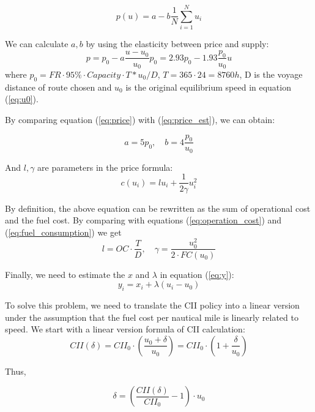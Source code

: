 \documentclass[a4paper,12pt]{article}
\begin{document}
\begin{equation*}
	p(u) = a - b \frac{1}{N}\sum_{i=1}^N u_i
\end{equation*}

We can calculate $a,b$ by using the elasticity between price and supply:
\begin{equation}
	\label{eq:price_est}
	p = p_0  - a \dfrac{u-u_0}{u_0} p_0 = 2.93 p_0 - 1.93 \dfrac{p_0}{u_0}u
\end{equation}
where $p_0 = FR \cdot 95\% \cdot Capacity \cdot T * u_0 / D$, $T = 365 \cdot 24 = 8760 h$, D is the voyage distance of route chosen and $u_0$ is the original equilibrium speed in equation (\ref{eq:u0}).

By comparing equation (\ref{eq:price}) with (\ref{eq:price_est}), we can obtain:

\begin{equation}
	a = 5p_0, \quad b = 4 \dfrac{p_0}{u_0}
\end{equation}

And $l, \gamma$ are parameters in the price formula:
\begin{equation*}
	c(u_i) = l u_i + \frac{1}{2 \gamma} u_i^2
\end{equation*}

By definition, the above equation can be rewritten as the sum of operational cost and the fuel cost. By comparing with equations (\ref{eq:operation_cost}) and (\ref{eq:fuel_consumption}) we get
\begin{equation}
	l = OC \cdot \dfrac{T}{D}, \quad \gamma = \dfrac{u_0^2}{2\cdot FC(u_0)}
\end{equation}

Finally, we need to estimate the $x$ and $\lambda$ in equation (\ref{eq:y}):
\begin{equation*}
	y_i = x_i + \lambda(u_i-u_0)
\end{equation*}

To solve this problem, we need to translate the CII policy into a linear version under the assumption that the fuel cost per nautical mile is linearly related to speed.
We start with a linear version formula of CII calculation:
\begin{equation}
	\label{eq:cii_linear}
	CII(\delta) = CII_0\cdot (\dfrac{u_0+\delta}{u_0})=CII_0\cdot (1 + \dfrac{\delta}{u_0})
\end{equation}

Thus,

\begin{equation}
	\delta = \left( \dfrac{CII(\delta)}{CII_0} -1 \right) \cdot u_0
\end{equation}
\end{document}
